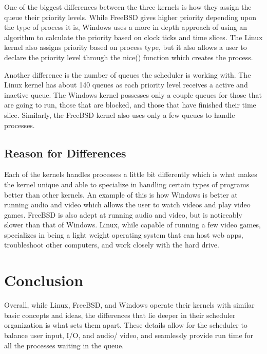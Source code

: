 \documentclass[10pt, draftclsnofoot,onecolumn]{IEEEtran}
\begin{document}
One of the biggest differences between the three kernels is how they assign the
queue their priority levels. While FreeBSD gives higher priority depending upon
the type of process it is, Windows uses a more in depth approach of using an
algorithm to calculate the priority based on clock ticks and time slices. The
Linux kernel also assigns priority based on process type, but it also allows a
user to declare the priority level through the nice() function which creates the
process.\par
Another difference is the number of queues the scheduler is working with. The
Linux kernel has about 140 queues as each priority level receives a active and
inactive queue. The Windows kernel possesses only a couple queues for those that
are going to run, those that are blocked, and those that have finished their time
slice. Similarly, the FreeBSD kernel also uses only a few queues to handle processes.

\subsection{Reason for Differences}

Each of the kernels handles processes a little bit differently which is what
makes the kernel unique and able to specialize in handling certain types of
programs better than other kernels. An example of this is how Windows is
better at running audio and video which allows the user to watch videos and
play video games. FreeBSD is also adept at running audio and video, but is
noticeably slower than that of Windows. Linux, while capable of running a few
video games, specializes in being a light weight operating system that can host
web apps, troubleshoot other computers, and work closely with the hard drive.

\section{Conclusion}

Overall, while Linux, FreeBSD, and Windows operate their kernels with similar
basic concepts and ideas, the differences that lie deeper in their scheduler
organization is what sets them apart. These details allow for the scheduler to
balance user input, I/O, and audio/ video, and seamlessly provide run time for
all the processes waiting in the queue.
\newpage

\end{document}
